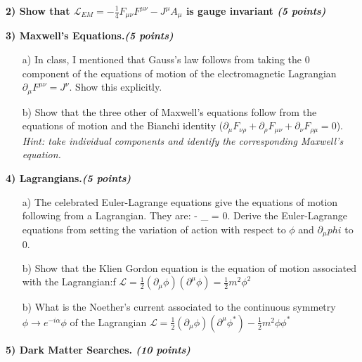 {\textbf{2) Show that  $\mathscr{L}_{EM} = -\frac{1}{4}F_{\mu\nu}F^{\mu\nu} - J^{\mu}A_{\mu}$ is gauge invariant \hfill \textit{(5 points)}}


\vspace*{0.25in}




\textbf{3) Maxwell’s Equations.\hfill \textit{(5 points)}}
\begin{itemize}
\item[a)]In class,  I mentioned  that Gauss’s law follows from taking the 0 component of the equations of motion of the electromagnetic Lagrangian $\partial_\mu F^{\mu\nu} = J^\nu$. 
Show this explicitly.
\item[b)]Show that the three other of Maxwell’s equations follow from the equations of motion and the Bianchi identity ($\partial_\mu F_{\nu\rho} +\partial_\rho F_{\mu\nu} +\partial_\nu F_{\rho\mu} =0$). \textit{Hint: take individual components and identify the corresponding Maxwell’s equation.}
\end{itemize}

\vspace*{0.25in}

\textbf{4) Lagrangians.\hfill \textit{(5 points)}}
\begin{itemize}
\item[a)]The celebrated Euler-Lagrange equations give the equations of motion following from a Lagrangian. 
They are: 
\be
{} - \partial_\mu {} = 0.
\ee
Derive the Euler-Lagrange equations from setting the variation of action with respect to $\phi$ and $\partial_\mu phi$  to 0.
\item[b)]Show that the Klien Gordon equation is the equation of motion associated with the Lagrangian:f $\mathscr{L}= \frac{1}{2}(\partial_\mu \phi)(\partial^{\mu}\phi) = \frac{1}{2}m^2\phi^2$
\item[b)]What is the Noether's current associated to the continuous symmetry $\phi \rightarrow e^{-i\alpha} \phi$ of the Lagrangian $\mathscr{L}= \frac{1}{2}(\partial_\mu \phi)(\partial^{\mu}\phi^*) - \frac{1}{2}m^2\phi\phi^*$
\end{itemize}

\vspace*{0.25in}

\textbf{5) Dark Matter Searches. \hfill \textit{(10 points)}}

}
